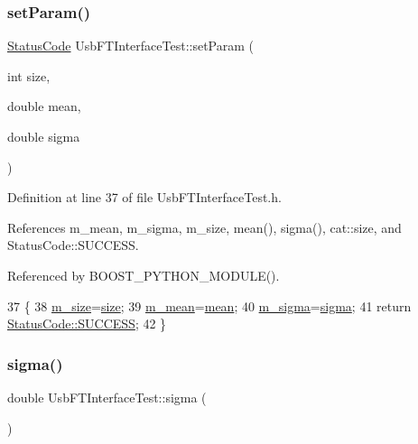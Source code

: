 \subsubsection{\texorpdfstring{set\+Param()}{setParam()}}
{\footnotesize\ttfamily \hyperlink{classStatusCode}{Status\+Code} Usb\+F\+T\+Interface\+Test\+::set\+Param (\begin{DoxyParamCaption}\item[{int}]{size,  }\item[{double}]{mean,  }\item[{double}]{sigma }\end{DoxyParamCaption})\hspace{0.3cm}{\ttfamily [inline]}}



Definition at line 37 of file Usb\+F\+T\+Interface\+Test.\+h.



References m\+\_\+mean, m\+\_\+sigma, m\+\_\+size, mean(), sigma(), cat\+::size, and Status\+Code\+::\+S\+U\+C\+C\+E\+SS.



Referenced by B\+O\+O\+S\+T\+\_\+\+P\+Y\+T\+H\+O\+N\+\_\+\+M\+O\+D\+U\+L\+E().


\begin{DoxyCode}
37                                                             \{
38     \hyperlink{classUsbFTInterfaceTest_a9028dd3c7f3533870d7c1f264a1ec1b4}{m\_size}=\hyperlink{namespacecat_a3eae50bb86a614752045105e00365a46}{size};
39     \hyperlink{classUsbFTInterfaceTest_a88bd9de98a903663a21e03368aa567fc}{m\_mean}=\hyperlink{classUsbFTInterfaceTest_a8b88ab4c18cff5e8da014ef6fcf39b90}{mean};
40     \hyperlink{classUsbFTInterfaceTest_a968e22a659f423b04c32a45d6d3160ea}{m\_sigma}=\hyperlink{classUsbFTInterfaceTest_a582fdf03be84fdd791a50a4129ce8938}{sigma};
41     \textcolor{keywordflow}{return} \hyperlink{classStatusCode_a6f565cbeadc76d14c72f047e5e85eb4badd0da38d3ba0d922efd1f4619bc37ad8}{StatusCode::SUCCESS};
42   \}
\end{DoxyCode}
\mbox{\label{classUsbFTInterfaceTest_a582fdf03be84fdd791a50a4129ce8938}} 
\subsubsection{\texorpdfstring{sigma()}{sigma()}}
{\footnotesize\ttfamily double Usb\+F\+T\+Interface\+Test\+::sigma (\begin{DoxyParamCaption}{ }\end{DoxyParamCaption})\hspace{0.3cm}{\ttfamily [inline]}}



